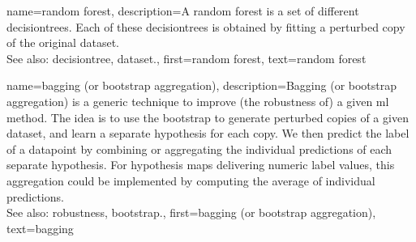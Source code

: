 {name={random forest},
	description={A random forest is a set of different \glspl{decisiontree}. 
		Each of these \glspl{decisiontree} is obtained by fitting a perturbed copy of 
		the original \gls{dataset}.
				\\
	See also: \gls{decisiontree}, \gls{dataset}.},
	first={random forest}, 
	text={random forest}
}

{name={bagging (or bootstrap aggregation)},
	description={Bagging (or bootstrap aggregation) 
		is a generic technique to improve (the \gls{robustness} of) a given \gls{ml} method. 
		The idea is to use the \gls{bootstrap} to generate perturbed copies of a given \gls{dataset},  
		and learn a separate \gls{hypothesis} for each copy. We then predict the \gls{label} of a \gls{datapoint} 
		by combining or aggregating the individual \glspl{prediction} 
		of each separate \gls{hypothesis}. For \gls{hypothesis} \glspl{map} delivering numeric \gls{label} 
		values, this aggregation could be implemented by computing the average of individual 
		\glspl{prediction}.
				\\
		See also: \gls{robustness}, \gls{bootstrap}.},
	first={bagging (or bootstrap aggregation)},
	text={bagging}
}


